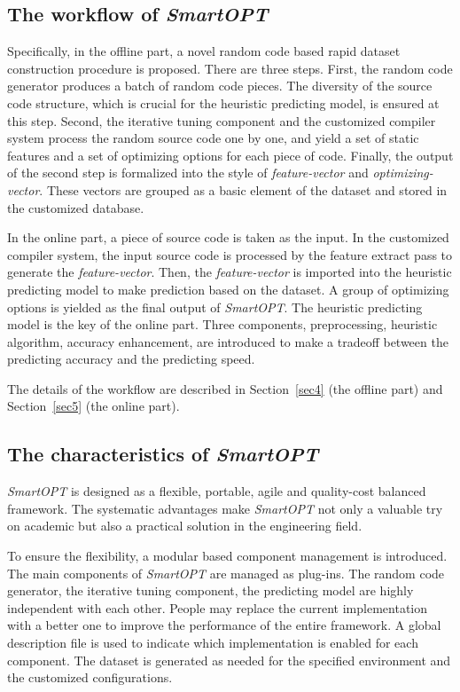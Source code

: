 \documentclass[bst/sn-mathphys]{sn-jnl}%
\theoremstyle{thmstyleone}%
\theoremstyle{thmstyletwo}%
\theoremstyle{thmstylethree}%
\begin{document}
\subsection{The workflow of \emph{SmartOPT}}\label{subsec0301}

Specifically, in the offline part, a novel random code based rapid dataset 
construction procedure is proposed. There are three steps. First, the random 
code generator produces a batch of random code pieces. The diversity of the 
source code structure, which is crucial for the heuristic predicting model, is 
ensured at this step. Second, the iterative tuning component and the customized
compiler system process the random source code one by one, and yield a set of 
static features and a set of optimizing options for each piece of code. 
Finally, the output of the second step is formalized into the style of 
\emph{feature-vector} and \emph{optimizing-vector}. These vectors are grouped 
as a basic element of the dataset and stored in the customized database.

In the online part, a piece of source code is taken as the input. In the 
customized compiler system, the input source code is processed by the feature 
extract pass to generate the \emph{feature-vector}. Then, the 
\emph{feature-vector} is imported into the heuristic predicting model to make 
prediction based on the dataset. A group of optimizing options is yielded as 
the final output of \emph{SmartOPT}. The heuristic predicting model is the key 
of the online part. Three components, preprocessing, heuristic algorithm, 
accuracy enhancement, are introduced to make a tradeoff between the predicting 
accuracy and the predicting speed.

The details of the workflow are described in Section~\ref{sec4} (the offline part) and Section~\ref{sec5} (the online part).

\subsection{The characteristics of \emph{SmartOPT}}\label{subsec0302}

\emph{SmartOPT} is designed as a flexible, portable, agile and quality-cost 
balanced framework. The systematic advantages make \emph{SmartOPT} not only a 
valuable try on academic but also a practical solution in the engineering 
field.

To ensure the flexibility, a modular based component management is introduced. 
The main components of \emph{SmartOPT} are managed as plug-ins. The random 
code generator, the iterative tuning component, the predicting model are 
highly independent with each other. People may replace the current 
implementation with a better one to improve the performance of the entire 
framework. A global description file is used to indicate which implementation 
is enabled for each component. The dataset is generated as needed for the 
specified environment and the customized configurations. 
\end{document}

